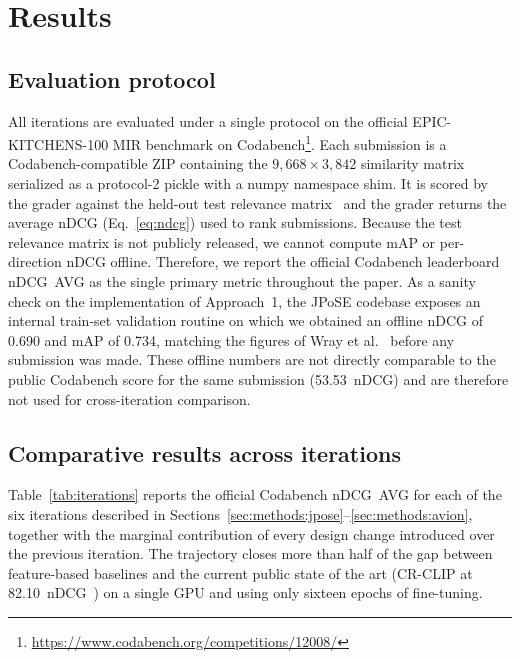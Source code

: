 \section{Results}
\label{sec:results}

\subsection{Evaluation protocol}
\label{sec:results:protocol}

All iterations are evaluated under a single protocol on the official EPIC-KITCHENS-100 MIR benchmark on Codabench\footnote{\url{https://www.codabench.org/competitions/12008/}}. Each submission is a Codabench-compatible ZIP containing the $9{,}668\times 3{,}842$ similarity matrix serialized as a protocol-2 pickle with a numpy namespace shim. It is scored by the grader against the held-out test relevance matrix~\cite{wray2021semantic} and the grader returns the average nDCG (Eq.~\ref{eq:ndcg}) used to rank submissions. Because the test relevance matrix is not publicly released, we cannot compute mAP or per-direction nDCG offline. Therefore, we report the official Codabench leaderboard nDCG~AVG as the single primary metric throughout the paper. As a sanity check on the implementation of Approach~1, the JPoSE codebase exposes an internal train-set validation routine on which we obtained an offline nDCG of 0.690 and mAP of 0.734, matching the figures of Wray et al.~\cite{wray2019jpose} before any submission was made. These offline numbers are not directly comparable to the public Codabench score for the same submission (53.53~nDCG) and are therefore not used for cross-iteration comparison.

\subsection{Comparative results across iterations}
\label{sec:results:main}

Table~\ref{tab:iterations} reports the official Codabench nDCG~AVG for each of the six iterations described in Sections~\ref{sec:methods:jpose}--\ref{sec:methods:avion}, together with the marginal contribution of every design change introduced over the previous iteration. The trajectory closes more than half of the gap between feature-based baselines and the current public state of the art (CR-CLIP at 82.10~nDCG~\cite{he2025crclip}) on a single GPU and using only sixteen epochs of fine-tuning.


